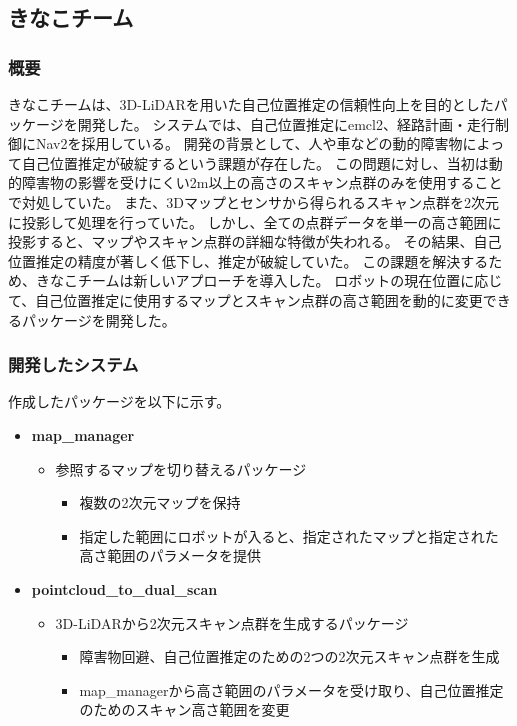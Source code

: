 \subsection{きなこチーム}

\subsubsection{概要}
きなこチームは、3D-LiDARを用いた自己位置推定の信頼性向上を目的としたパッケージを開発した。
システムでは、自己位置推定にemcl2、経路計画・走行制御にNav2を採用している。
開発の背景として、人や車などの動的障害物によって自己位置推定が破綻するという課題が存在した。
この問題に対し、当初は動的障害物の影響を受けにくい2m以上の高さのスキャン点群のみを使用することで対処していた。
また、3Dマップとセンサから得られるスキャン点群を2次元に投影して処理を行っていた。
しかし、全ての点群データを単一の高さ範囲に投影すると、マップやスキャン点群の詳細な特徴が失われる。
その結果、自己位置推定の精度が著しく低下し、推定が破綻していた。
この課題を解決するため、きなこチームは新しいアプローチを導入した。
ロボットの現在位置に応じて、自己位置推定に使用するマップとスキャン点群の高さ範囲を動的に変更できるパッケージを開発した。

\subsubsection{開発したシステム}
作成したパッケージを以下に示す。

\begin{itemize}
  \item \textbf{map\_manager}
    \begin{itemize}
      \item 参照するマップを切り替えるパッケージ
      \begin{itemize}
        \item 複数の2次元マップを保持
        \item 指定した範囲にロボットが入ると、指定されたマップと指定された高さ範囲のパラメータを提供
      \end{itemize}
    \end{itemize}
  \item \textbf{pointcloud\_to\_dual\_scan}
    \begin{itemize}
      \item 3D-LiDARから2次元スキャン点群を生成するパッケージ
      \begin{itemize}
        \item 障害物回避、自己位置推定のための2つの2次元スキャン点群を生成
        \item map\_managerから高さ範囲のパラメータを受け取り、自己位置推定のためのスキャン高さ範囲を変更
      \end{itemize}
    \end{itemize}
\end{itemize}

